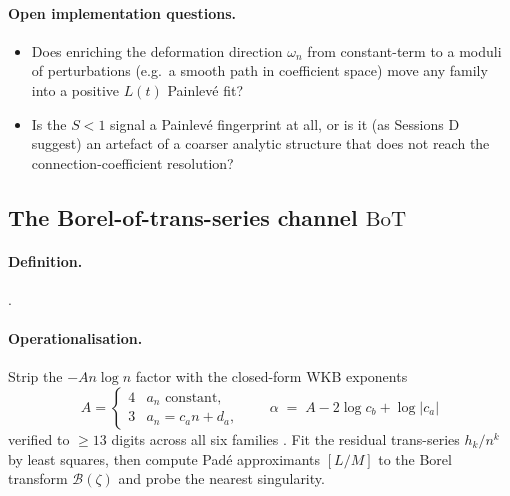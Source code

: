 \documentclass[11pt,reqno]{amsart}
\theoremstyle{plain}
\theoremstyle{definition}
\theoremstyle{remark}
\newcommand{\Lt}{L(t)}
\newcommand{\BoT}{\mathrm{BoT}}
\newcommand{\Borel}{\mathcal{B}}
\begin{document}
\paragraph{Open implementation questions.}
\begin{itemize}
\item Does enriching the deformation direction $\omega_n$ from
constant-term to a moduli of perturbations (e.g.\ a smooth
path in coefficient space) move any family into a positive
$\Lt$ Painlev\'e fit?
\item Is the $S<1$ signal a Painlev\'e fingerprint at all,
or is it (as Sessions D suggest) an artefact of a coarser
analytic structure that does not reach the
connection-coefficient resolution?
\end{itemize}

\subsection{The Borel-of-trans-series channel $\BoT$}
\label{ssec:bot}

\paragraph{Definition.} .

\paragraph{Operationalisation.} Strip the $-A n \log n$
factor with the closed-form WKB exponents
\[
  A = \begin{cases} 4 & a_n \text{ constant}, \\
                    3 & a_n = c_a n + d_a, \end{cases}
  \qquad
  \alpha \;=\; A - 2 \log c_b + \log|c_a|
\]
verified to $\ge 13$ digits across all six families
\cite{siarc_borel_kscan}. Fit the residual trans-series
$h_k/n^k$ by least squares, then compute Pad\'e approximants
$[L/M]$ to the Borel transform $\Borel(\zeta)$ and probe the
nearest singularity.
\end{document}
